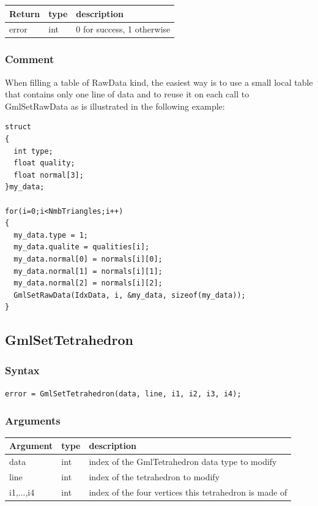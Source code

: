 \documentclass[a4paper,12pt]{article}
\begin{document}
\medskip

\begin{tabular}{|m{2cm}|m{1.5cm}|m{10.5cm}|}
\hline
Return    & type   & description \\
\hline
error     & int     & 0 for success, 1 otherwise \\
\hline
\end{tabular}
\subsubsection*{Comment}
When filling a table of RawData kind, the easiest way is to use a small local table that contains only one line of data and to reuse it on each call to GmlSetRawData as is illustrated in the following example:

\begin{tt}
\begin{verbatim}
struct
{
  int type;
  float quality;
  float normal[3];
}my_data;

for(i=0;i<NmbTriangles;i++)
{
  my_data.type = 1;
  my_data.qualite = qualities[i];
  my_data.normal[0] = normals[i][0];
  my_data.normal[1] = normals[i][1];
  my_data.normal[2] = normals[i][2];
  GmlSetRawData(IdxData, i, &my_data, sizeof(my_data));
}
\end{verbatim}
\end{tt}
\normalfont


\subsection{GmlSetTetrahedron}
\subsubsection*{Syntax}
{\tt error = GmlSetTetrahedron(data, line, i1, i2, i3, i4);}
\subsubsection*{Arguments}

\begin{tabular}{|m{2cm}|m{1.5cm}|m{10.5cm}|}
\hline
Argument   & type   & description \\
\hline
data       & int    & index of the GmlTetrahedron data type to modify \\
\hline
line       & int    & index of the tetrahedron to modify \\
\hline
i1,...,i4  & int    & index of the four vertices this tetrahedron is made of \\
\hline
\end{tabular}
\end{document}

